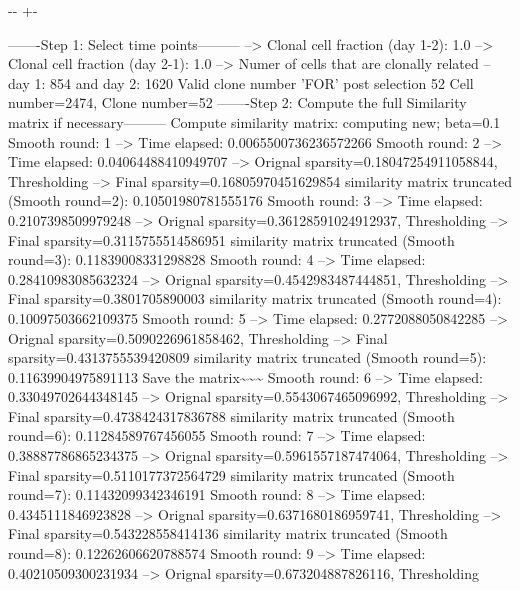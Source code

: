 \documentclass[letterpaper,10pt,english]{sphinxmanual}
\newlength\nbsphinxcodecellspacing
\begin{document}
{

\kern-\sphinxverbatimsmallskipamount\kern-\baselineskip
\kern+\FrameHeightAdjust\kern-\fboxrule
\vspace{\nbsphinxcodecellspacing}

\begin{sphinxVerbatim}[commandchars=\\\{\}]
-------Step 1: Select time points---------
--> Clonal cell fraction (day 1-2): 1.0
--> Clonal cell fraction (day 2-1): 1.0
--> Numer of cells that are clonally related -- day 1: 854  and day 2: 1620
Valid clone number 'FOR' post selection 52
Cell number=2474, Clone number=52
-------Step 2: Compute the full Similarity matrix if necessary---------
Compute similarity matrix: computing new; beta=0.1
Smooth round: 1
--> Time elapsed: 0.0065500736236572266
Smooth round: 2
--> Time elapsed: 0.04064488410949707
--> Orignal sparsity=0.18047254911058844, Thresholding
--> Final sparsity=0.16805970451629854
similarity matrix truncated (Smooth round=2):  0.10501980781555176
Smooth round: 3
--> Time elapsed: 0.2107398509979248
--> Orignal sparsity=0.36128591024912937, Thresholding
--> Final sparsity=0.3115755514586951
similarity matrix truncated (Smooth round=3):  0.11839008331298828
Smooth round: 4
--> Time elapsed: 0.28410983085632324
--> Orignal sparsity=0.4542983487444851, Thresholding
--> Final sparsity=0.3801705890003
similarity matrix truncated (Smooth round=4):  0.10097503662109375
Smooth round: 5
--> Time elapsed: 0.2772088050842285
--> Orignal sparsity=0.5090226961858462, Thresholding
--> Final sparsity=0.4313755539420809
similarity matrix truncated (Smooth round=5):  0.11639904975891113
Save the matrix\textasciitilde{}\textasciitilde{}\textasciitilde{}
Smooth round: 6
--> Time elapsed: 0.33049702644348145
--> Orignal sparsity=0.5543067465096992, Thresholding
--> Final sparsity=0.4738424317836788
similarity matrix truncated (Smooth round=6):  0.11284589767456055
Smooth round: 7
--> Time elapsed: 0.38887786865234375
--> Orignal sparsity=0.5961557187474064, Thresholding
--> Final sparsity=0.5110177372564729
similarity matrix truncated (Smooth round=7):  0.11432099342346191
Smooth round: 8
--> Time elapsed: 0.4345111846923828
--> Orignal sparsity=0.6371680186959741, Thresholding
--> Final sparsity=0.543228558414136
similarity matrix truncated (Smooth round=8):  0.12262606620788574
Smooth round: 9
--> Time elapsed: 0.40210509300231934
--> Orignal sparsity=0.673204887826116, Thresholding

\end{sphinxVerbatim}}
\end{document}
